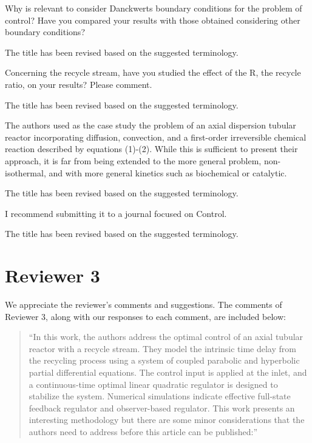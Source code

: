 \documentclass[10pt,answers]{exam}
\begin{document}
\begin{questions}

    \question Why is relevant to consider Danckwerts boundary conditions for the problem of control? Have you compared your results with those obtained considering other boundary conditions?

    \begin{solutionorbox}
        The title has been revised based on the suggested terminology.
    \end{solutionorbox}


    \question Concerning the recycle stream, have you studied the effect of the R, the recycle ratio, on your results? Please comment.

    \begin{solutionorbox}
        The title has been revised based on the suggested terminology.
    \end{solutionorbox}

    
    \question The authors used as the case study the problem of an axial dispersion tubular reactor incorporating diffusion, convection, and a first-order irreversible chemical reaction described by equations (1)-(2). While this is sufficient to present their approach, it is far from being extended to the more general problem, non-isothermal, and with more general kinetics such as biochemical or catalytic.

    \begin{solutionorbox}
        The title has been revised based on the suggested terminology.
    \end{solutionorbox}


    \question I recommend submitting it to a journal focused on Control.

    \begin{solutionorbox}
        The title has been revised based on the suggested terminology.
    \end{solutionorbox}

\end{questions}

\newpage
\section*{Reviewer 3}

We appreciate the reviewer's comments and suggestions. The comments of Reviewer 3, along with our responses to each comment, are included below:

\begin{quote}
    ``In this work, the authors address the optimal control of an axial tubular reactor with a recycle stream. They model the intrinsic time delay from the recycling process using a system of coupled parabolic and hyperbolic partial differential equations. The control input is applied at the inlet, and a continuous-time optimal linear quadratic regulator is designed to stabilize the system. Numerical simulations indicate effective full-state feedback regulator and observer-based regulator. This work presents an interesting methodology but there are some minor considerations that the authors need to address before this article can be published:''
\end{quote}
\end{document}
